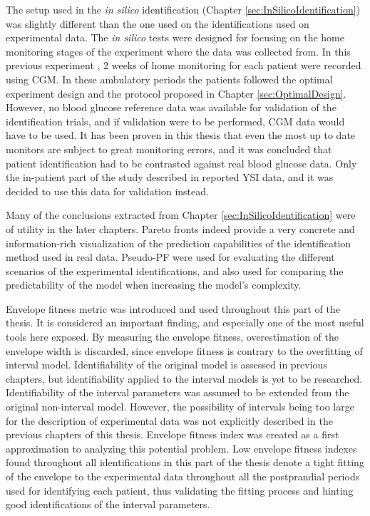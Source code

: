 The setup used in the \textit{in silico} identification (Chapter \ref{sec:InSilicoIdentification}) was slightly different than the one used on the identifications used on experimental data. The \textit{in silico} tests were designed for focusing on the home monitoring stages of the experiment where the data was collected from. In this previous experiment \cite{paoloibolus2012}, 2 weeks of home monitoring for each patient were recorded using CGM. In these ambulatory periods the patients followed the optimal experiment design and the protocol proposed in Chapter \ref{sec:OptimalDesign}. However, no blood glucose reference data was available for validation of the identification trials, and if validation were to be performed, CGM data would have to be used. It has been proven in this thesis that even the most up to date monitors are subject to great monitoring errors, and it was concluded that patient identification had to be contrasted against real blood glucose data. Only the in-patient part of the study described  in \cite{paoloibolus2012} reported YSI data, and it was decided to use this data for validation instead.

Many of the conclusions extracted from Chapter \ref{sec:InSilicoIdentification} were of utility in the later chapters. Pareto fronts indeed provide a very concrete and information-rich visualization of the prediction capabilities of the identification method used in real data. Pseudo-PF were used for evaluating the different scenarios of the experimental identifications, and also used for comparing the predictability of the model when increasing the model's complexity.

Envelope fitness metric was introduced and used throughout this part of the thesis. It is considered an important finding, and especially one of the most useful tools here exposed. By measuring the envelope fitness, overestimation of the envelope width is discarded, since envelope fitness is contrary to the overfitting of interval model. Identifiability of the original model is assessed in previous chapters, but identifiability applied to the interval models is yet to be researched. Identifiability of the interval parameters was assumed to be extended from the original non-interval model. However, the possibility of intervals being too large for the description of experimental data was not explicitly described in the previous chapters of this thesis. Envelope fitness index was created as a first approximation to analyzing this potential problem. Low envelope fitness indexes found throughout all identifications in this part of the thesis denote a tight fitting of the envelope to the experimental data throughout all the postprandial periods used for identifying each patient, thus validating the fitting process and hinting good identifications of the interval parameters.

